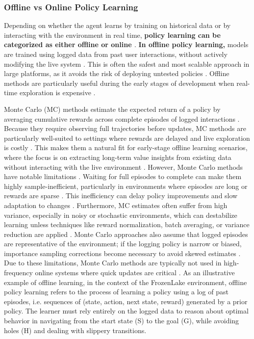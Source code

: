 \documentclass[final]{anthology-ch}         %
\begin{document}
\subsubsection{Offline vs Online Policy Learning}
Depending on whether the agent learns by training on historical data or by interacting with the environment in real time,  \textbf{policy learning can be categorized as either offline or online \cite{Sutton1998}}. \textbf{In offline policy learning, }models are trained using logged data from past user interactions, without actively modifying the live system \cite{levine2020offline}. This is often the safest and most scalable approach in large platforms, as it avoids the risk of deploying untested policies \cite{levine2020offline}. Offline methods are particularly useful during the early stages of development when real-time exploration is expensive \cite{levine2020offline, gauci2018horizon, Mehrotra2020}. 

Monte Carlo (MC) methods estimate the expected return of a policy by averaging cumulative rewards across complete episodes of logged interactions \cite{Sutton1998, levine2020offline}. Because they require observing full trajectories before updates, MC methods are particularly well-suited to settings where rewards are delayed and live exploration is costly \cite{Sutton1998, levine2020offline}. This makes them a natural fit for early-stage offline learning scenarios, where the focus is on extracting long-term value insights from existing data without interacting with the live environment \cite{Sutton1998, levine2020offline}. However, Monte Carlo methods have notable limitations \cite{Sutton1998}. Waiting for full episodes to complete can make them highly sample-inefficient, particularly in environments where episodes are long or rewards are sparse \cite{levine2020offline}. This inefficiency can delay policy improvements and slow adaptation to changes \cite{dulac2019challenges}. Furthermore, MC estimates often suffer from high variance, especially in noisy or stochastic environments, which can destabilize learning unless techniques like reward normalization, batch averaging, or variance reduction are applied \cite{Sutton1998}. Monte Carlo approaches also assume that logged episodes are representative of the environment; if the logging policy is narrow or biased, importance sampling corrections become necessary to avoid skewed estimates \cite{swaminathan2015counterfactual}. Due to these limitations, Monte Carlo methods are typically not used in high-frequency online systems where quick updates are critical \cite{dulac2019challenges}. As an illustrative example of offline learning, in the context of the FrozenLake environment, offline policy learning refers to the process of learning a policy using a log of past episodes, i.e. sequences of (state, action, next state, reward) generated by a prior policy.  The learner must rely entirely on the logged data to reason about optimal behavior in navigating from the start state (S) to the goal (G), while avoiding holes (H) and dealing with slippery transitions. 
\end{document}
